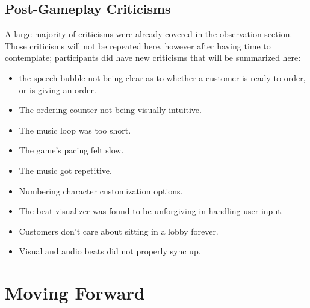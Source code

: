 \documentclass[twoside,twocolumn]{article}
\begin{document}
\subsection{Post-Gameplay Criticisms}
A large majority of criticisms were already covered in the \hyperlink{section.3}{observation section}. Those
criticisms will not be repeated here, however after having time to contemplate; participants did
have new criticisms that will be summarized here:
\begin{itemize}
    \item the speech bubble not being clear as to whether a customer is ready to order, or is giving an order.
    \item The ordering counter not being visually intuitive.
    \item The music loop was too short.
    \item The game's pacing felt slow.
    \item The music got repetitive.
    \item Numbering character customization options.
    \item The beat visualizer was found to be unforgiving in handling user input.
    \item Customers don't care about sitting in a lobby forever.
    \item Visual and audio beats did not properly sync up.
\end{itemize}
\section{Moving Forward}



 

\end{document}
